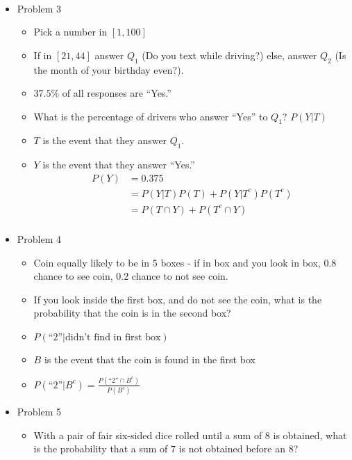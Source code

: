 \documentclass[12pt]{article}
\begin{document}
\begin{itemize}
\begin{itemize}
\begin{align*}
                \end{align*}
            \end{itemize}
            \item Problem 3
            \begin{itemize}
                \item Pick a number in $[1, 100]$
                \item If in $[21, 44]$ answer $Q_1$ (Do you text while driving?) else, answer $Q_2$ (Is the month of your birthday even?).
                \item $37.5\%$ of all responses are ``Yes.''
                \item What is the percentage of drivers who answer ``Yes'' to $Q_1$? $P(Y|T)$
                \item $T$ is the event that they answer $Q_1$.
                \item $Y$ is the event that they answer ``Yes.''
                \begin{align*}
                    P(Y) &= 0.375\\
                    &= P(Y|T)P(T) + P(Y|T^c)P(T^c)\\
                    &= P(T \cap Y) + P(T^c \cap Y)\\
                \end{align*}
            \end{itemize}
            \item Problem 4
            \begin{itemize}
                \item Coin equally likely to be in $5$ boxes - if in box and you look in box, $0.8$ chance to see coin, $0.2$ chance to not see coin.
                \item If you look inside the first box, and do not see the coin, what is the probability that the coin is in the second box?
                \item $P(\text{``}2\text{''} | \text{didn't find in first box})$
                \item $B$ is the event that the coin is found in the first box
                \item $P(\text{``}2\text{''} | B^c) = \frac{P(\text{``}2\text{''} \cap B^c)}{P(B^c)}$
            \end{itemize}
            \item Problem 5
            \begin{itemize}
                \item With a pair of fair six-sided dice rolled until a sum of $8$ is obtained, what is the probability that a sum of $7$ is not obtained before an $8$?

\end{itemize}
\end{itemize}
\end{document}
